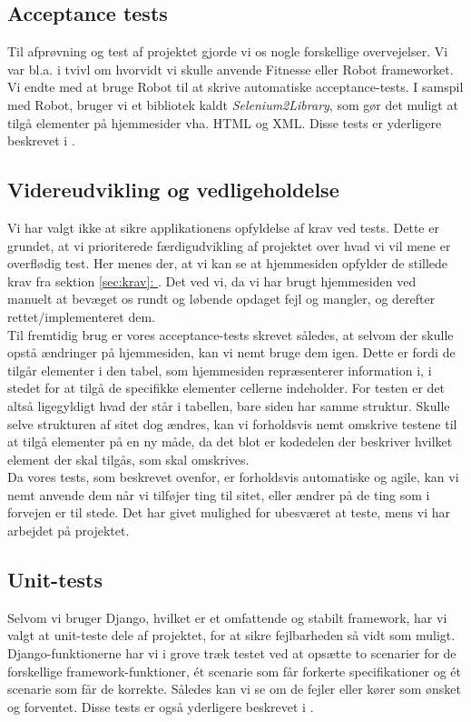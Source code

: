 \documentclass[12pt]{article}
\begin{document}
\subsection{Acceptance tests}
Til afprøvning og test af projektet gjorde vi os nogle forskellige overvejelser. Vi var bl.a. i tvivl om hvorvidt vi skulle anvende Fitnesse eller Robot frameworket. Vi endte med at bruge Robot til at skrive automatiske acceptance-tests. I samspil med Robot, bruger vi et bibliotek kaldt \textit{Selenium2Library}, som gør det muligt at tilgå elementer på hjemmesider vha. HTML og XML.
Disse tests er yderligere beskrevet i .

\subsection{Videreudvikling og vedligeholdelse}
Vi har valgt ikke at sikre applikationens opfyldelse af krav ved tests. Dette er grundet, at vi prioriterede færdigudvikling af projektet over hvad vi vil mene er overflødig test. Her menes der, at vi kan se at hjemmesiden opfylder de stillede krav fra sektion \hyperref[sec:krav]{\ref*{sec:krav}: }. Det ved vi, da vi har brugt hjemmesiden ved manuelt at bevæget os rundt og løbende opdaget fejl og mangler, og derefter rettet/implementeret dem. \\
Til fremtidig brug er vores acceptance-tests skrevet således, at selvom der skulle opstå ændringer på hjemmesiden, kan vi nemt bruge dem igen. Dette er fordi de tilgår elementer i den tabel, som hjemmesiden repræsenterer information i, i stedet for at tilgå de specifikke elementer cellerne indeholder. For testen er det altså ligegyldigt hvad der står i tabellen, bare siden har samme struktur. Skulle selve strukturen af sitet dog ændres, kan vi forholdsvis nemt omskrive testene til at tilgå elementer på en ny måde, da det blot er kodedelen der beskriver hvilket element der skal tilgås, som skal omskrives. \\
Da vores tests, som beskrevet ovenfor, er forholdsvis automatiske og agile, kan vi nemt anvende dem når vi tilføjer ting til sitet, eller ændrer på de ting som i forvejen er til stede. Det har givet mulighed for ubesværet at teste, mens vi har arbejdet på projektet. \\

\subsection{Unit-tests}
Selvom vi bruger Django, hvilket er et omfattende og stabilt framework, har vi valgt at unit-teste dele af projektet, for at sikre fejlbarheden så vidt som muligt. Django-funktionerne har vi i grove træk testet ved at opsætte to scenarier for de forskellige framework-funktioner, ét scenarie som får forkerte specifikationer og ét scenarie som får de korrekte. Således kan vi se om de fejler eller kører som ønsket og forventet. Disse tests er også yderligere beskrevet i .
\end{document}
